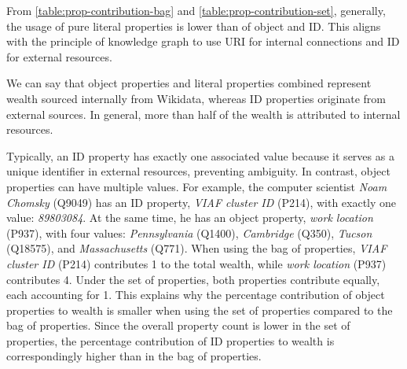 From \autoref{table:prop-contribution-bag} and \autoref{table:prop-contribution-set}, generally, the usage of pure literal properties is lower than of object and ID. This aligns with the principle of knowledge graph to use URI for internal connections and ID for external resources.

We can say that object properties and literal properties combined represent wealth sourced internally from Wikidata, whereas ID properties originate from external sources. In general, more than half of the wealth is attributed to internal resources.

Typically, an ID property has exactly one associated value because it serves as a unique identifier in external resources, preventing ambiguity. In contrast, object properties can have multiple values. For example, the computer scientist \textit{Noam Chomsky} (Q9049) has an ID property, \textit{VIAF cluster ID} (P214), with exactly one value: \textit{89803084}. At the same time, he has an object property, \textit{work location} (P937), with four values: \textit{Pennsylvania} (Q1400), \textit{Cambridge} (Q350), \textit{Tucson} (Q18575), and \textit{Massachusetts} (Q771). When using the bag of properties, \textit{VIAF cluster ID} (P214) contributes 1 to the total wealth, while \textit{work location} (P937) contributes 4. Under the set of properties, both properties contribute equally, each accounting for 1. This explains why the percentage contribution of object properties to wealth is smaller when using the set of properties compared to the bag of properties. Since the overall property count is lower in the set of properties, the percentage contribution of ID properties to wealth is correspondingly higher than in the bag of properties.